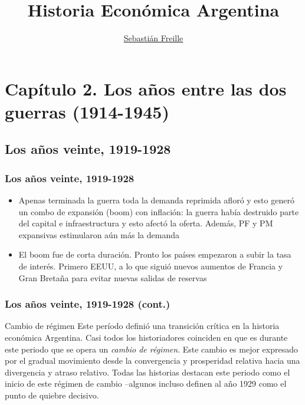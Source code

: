 \documentclass[14pt,aspectratio=169]{beamer}
\title{Historia Económica Argentina}
\author{\underline{Sebastián Freille} \inst{1}}
\institute[shortinst]{\inst{1} IEF-UNC \\ UCC}
\date{}
\begin{document}
{
  \begin{frame}
    \titlepage
  \end{frame}
}

  
  \section{Capítulo 2. Los años entre las dos guerras (1914-1945)}


  \subsection{Los años veinte, 1919-1928}


 \begin{frame}\frametitle{Los años veinte, 1919-1928}
    \begin{itemize}\itemsep 10pt
      \item Apenas terminada la guerra toda la demanda reprimida
        afloró y esto generó un combo de expansión (boom) con
        inflación: la guerra había destruido parte del capital e
        infraestructura y esto afectó la oferta. Además, PF y PM
        expansivas estimularon aún más la demanda
        \item El boom fue de corta duración. Pronto los países
          empezaron a subir la tasa de interés. Primero EEUU, a lo que
          siguió nuevos aumentos de Francia y Gran Bretaña para evitar
          nuevas salidas de reservas
                 \end{itemize}
      \end{frame}
  


 \begin{frame}\frametitle{Los años veinte, 1919-1928 (cont.)}
   \begin{block}{Cambio de régimen}
     Este período definió una transición crítica en la
       historia económica
Argentina. Casi todos los historiadores coinciden en que es durante
este periodo que se opera un \textit{cambio de régimen}. Este cambio
es mejor expresado por el gradual movimiento desde la convergencia y
prosperidad relativa hacia una divergencia y atraso relativo. Todas
las historias destacan este periodo como el inicio de este régimen de
cambio --algunos incluso definen al año 1929 como el punto de quiebre
decisivo. 
     \end{block}
      \end{frame}
\end{document}
